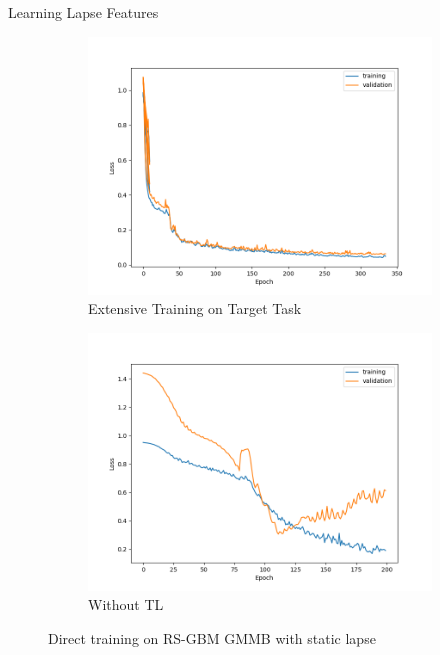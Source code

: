 \documentclass[9pt,handout]{beamer}
\begin{document}
\begin{frame}{Learning Lapse Features}
    \begin{figure}[ht!]
        \centering
        \begin{subfigure}{0.48\textwidth}
            \includegraphics[width=\textwidth]{../project3/figures/figure1a.png}
            \caption{Extensive Training on Target Task}
        \end{subfigure}
        \begin{subfigure}{0.48\textwidth}
            \includegraphics[width=\textwidth]{../project3/figures/figure1b.png}
            \caption{Without TL}
        \end{subfigure}
        \caption{Direct training on RS-GBM GMMB with static lapse}
    \end{figure}
\end{frame}
\end{document}
